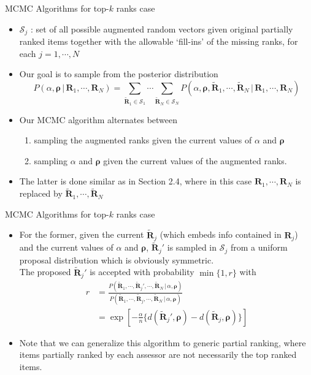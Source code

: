 \documentclass[11pt]{beamer}
\begin{document}
\begin{frame}{MCMC Algorithms for top-$k$ ranks case}
\begin{itemize}
    \item $\mathcal{S}_j$ : set of all possible augmented random vectors given original partially ranked items together with the allowable `fill-ins' of the missing ranks, for each $j=1, \cdots, N$
    \item Our goal is to sample from the posterior distribution 
    \begin{equation*}
        P(\alpha, \boldsymbol{\rho}\, |\, \mathbf{R}_1, \cdots, \mathbf{R}_N)=\sum_{\tilde{\mathbf{R}}_1\in \mathcal{S}_1}\cdots \sum_{\tilde{\mathbf{R}}_N\in \mathcal{S}_N}P(\alpha, \boldsymbol{\rho}, \tilde{\mathbf{R}}_1, \cdots,\tilde{\mathbf{R}}_N\, |\, \mathbf{R}_1, \cdots, \mathbf{R}_N )
    \end{equation*}
    \item Our MCMC algorithm alternates between
    \begin{enumerate}
        \item  sampling the augmented ranks given the current values of $\alpha$ and $\boldsymbol{\rho}$
        \item sampling $\alpha$ and $\boldsymbol{\rho}$ given the current values of the augmented ranks.
    \end{enumerate}
    \item The latter is done similar as in Section 2.4, where in this case $\mathbf{R}_1, \cdots, \mathbf{R}_N$ is replaced by $\tilde{\mathbf{R}}_1, \cdots,\tilde{\mathbf{R}}_N$ 
\end{itemize}
\end{frame}

\begin{frame}{MCMC Algorithms for top-$k$ ranks case}
\begin{itemize}
    \item For the former, given the current $\tilde{\mathbf{R}}_j$ (which embeds info contained in $\mathbf{R}_j$) and the current values of $\alpha$ and $\boldsymbol{\rho}$, $\tilde{\mathbf{R}}_j'$ is sampled in $\mathcal{S}_j$ from a uniform proposal distribution which is obviously symmetric.\\ The proposed $\tilde{\mathbf{R}}_j'$ is accepted with probability $\min\{1,r\}$ with 
    \begin{align*}
        r&= \frac{P(\tilde{\mathbf{R}}_1, \cdots, \tilde{\mathbf{R}}_j',\cdots, \tilde{\mathbf{R}}_N\,|\, \alpha, \boldsymbol{\rho})}{P(\tilde{\mathbf{R}}_1, \cdots, \tilde{\mathbf{R}}_j,\cdots, \tilde{\mathbf{R}}_N\,|\, \alpha, \boldsymbol{\rho})} \\ &=\exp[-\frac{\alpha}{n}\big\{d(\tilde{\mathbf{R}}_j', \boldsymbol{\rho})-d(\tilde{\mathbf{R}}_j, \boldsymbol{\rho}) \big\}] 
    \end{align*}
    \item Note that we can generalize this algorithm to generic partial ranking, where items partially ranked by each assessor are not necessarily the top ranked items. 
\end{itemize}
\end{frame}
\end{document}
